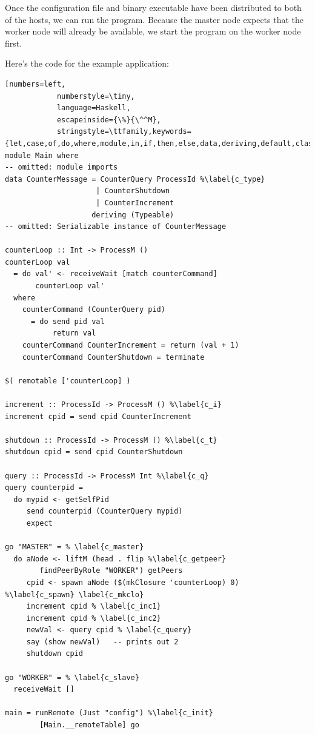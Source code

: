 \documentclass{sigplanconf}
\newcommand\apb[1]{\nb{apb}{#1}}
\begin{document}
Once the configuration file and binary executable have been distributed to both of the hosts, we can run the program. Because the master node expects that the worker node will already be available, we start the program on the worker node first.

Here's the code for the example application:

\begin{lstlisting}[numbers=left,
			numberstyle=\tiny,
			language=Haskell,
			escapeinside={\%}{\^^M},
			stringstyle=\ttfamily,keywords={let,case,of,do,where,module,in,if,then,else,data,deriving,default,class,instance,import,hiding,forall,qualified,newtype,type,as}]
module Main where
-- omitted: module imports
data CounterMessage = CounterQuery ProcessId %\label{c_type}
                     | CounterShutdown
                     | CounterIncrement 
                    deriving (Typeable)
-- omitted: Serializable instance of CounterMessage

counterLoop :: Int -> ProcessM ()
counterLoop val
  = do val' <- receiveWait [match counterCommand]
       counterLoop val'
  where
    counterCommand (CounterQuery pid) 
      = do send pid val
           return val
    counterCommand CounterIncrement = return (val + 1)
    counterCommand CounterShutdown = terminate

$( remotable ['counterLoop] )

increment :: ProcessId -> ProcessM () %\label{c_i}
increment cpid = send cpid CounterIncrement

shutdown :: ProcessId -> ProcessM () %\label{c_t}
shutdown cpid = send cpid CounterShutdown

query :: ProcessId -> ProcessM Int %\label{c_q}
query counterpid =
  do mypid <- getSelfPid
     send counterpid (CounterQuery mypid)
     expect

go "MASTER" = % \label{c_master}
  do aNode <- liftM (head . flip %\label{c_getpeer}
        findPeerByRole "WORKER") getPeers
     cpid <- spawn aNode ($(mkClosure 'counterLoop) 0) %\label{c_spawn} \label{c_mkclo}
     increment cpid % \label{c_inc1}
     increment cpid % \label{c_inc2}
     newVal <- query cpid % \label{c_query}
     say (show newVal)   -- prints out 2
     shutdown cpid

go "WORKER" = % \label{c_slave}
  receiveWait []

main = runRemote (Just "config") %\label{c_init}
        [Main.__remoteTable] go
\end{lstlisting}
\end{document}
